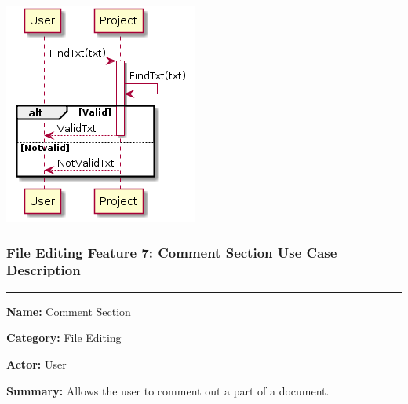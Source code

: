 \documentclass[twoside,letterpaper]{article}
\begin{document}
\bigskip

\includegraphics[width=\textwidth]{images/SequenceDiagrams/FindTxt}

\newpage

\subsubsection[File Editing Feature 7: Comment Section]{\rmfamily\bfseries\color{black}
	File Editing Feature 7: Comment Section Use Case Description}
\hypertarget{RefHeading22059017292}{}

\vspace{2pt}
\hrule
\vspace{8pt}
	\noindent\textbf{Name:} Comment Section \newline
	
	\noindent\textbf{Category:} File Editing \newline
	
	\noindent\textbf{Actor:} User \newline
	
	\noindent\textbf{Summary:} Allows the user to comment out a part of a document. \newline
	
\end{document}
